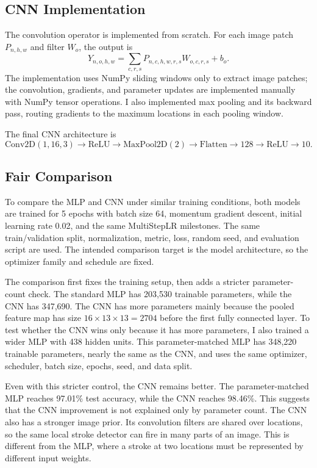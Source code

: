 \documentclass[11pt]{ctexart}
\begin{document}
\subsection{CNN Implementation}
The convolution operator is implemented from scratch. For each image patch $P_{n,h,w}$ and filter $W_o$, the output is
\[
Y_{n,o,h,w} = \sum_{c,r,s} P_{n,c,h,w,r,s} W_{o,c,r,s} + b_o.
\]
The implementation uses NumPy sliding windows only to extract image patches; the convolution, gradients, and parameter updates are implemented manually with NumPy tensor operations. I also implemented max pooling and its backward pass, routing gradients to the maximum locations in each pooling window.

The final CNN architecture is
\[
\text{Conv2D}(1,16,3) \rightarrow \text{ReLU} \rightarrow \text{MaxPool2D}(2)
\rightarrow \text{Flatten} \rightarrow 128 \rightarrow \text{ReLU} \rightarrow 10.
\]

\subsection{Fair Comparison}
To compare the MLP and CNN under similar training conditions, both models are trained for 5 epochs with batch size 64, momentum gradient descent, initial learning rate 0.02, and the same MultiStepLR milestones. The same train/validation split, normalization, metric, loss, random seed, and evaluation script are used. The intended comparison target is the model architecture, so the optimizer family and schedule are fixed.

The comparison first fixes the training setup, then adds a stricter parameter-count check. The standard MLP has 203,530 trainable parameters, while the CNN has 347,690. The CNN has more parameters mainly because the pooled feature map has size $16\times13\times13=2704$ before the first fully connected layer. To test whether the CNN wins only because it has more parameters, I also trained a wider MLP with 438 hidden units. This parameter-matched MLP has 348,220 trainable parameters, nearly the same as the CNN, and uses the same optimizer, scheduler, batch size, epochs, seed, and data split.

Even with this stricter control, the CNN remains better. The parameter-matched MLP reaches 97.01\% test accuracy, while the CNN reaches 98.46\%. This suggests that the CNN improvement is not explained only by parameter count. The CNN also has a stronger image prior. Its convolution filters are shared over locations, so the same local stroke detector can fire in many parts of an image. This is different from the MLP, where a stroke at two locations must be represented by different input weights.
\end{document}
